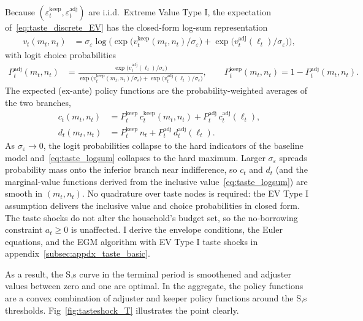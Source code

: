 Because $(\varepsilon_t^{\text{keep}},\varepsilon_t^{\text{adj}})$ are i.i.d.\ Extreme Value Type I, the expectation of~\eqref{eq:taste_discrete_EV} has the closed-form log-sum representation
\begin{align}
	v_t(m_t,n_t)
	&= \sigma_\varepsilon \log\Big(
		\exp\big(v_t^{\text{keep}}(m_t,n_t)/\sigma_\varepsilon\big)
		+ \exp\big(v_t^{\text{adj}}(\ell_t)/\sigma_\varepsilon\big)
	\Big), \label{eq:taste_logsum}
\end{align}
with logit choice probabilities
\begin{align}
	P_t^{\text{adj}}(m_t,n_t)
	&= \frac{\exp\big(v_t^{\text{adj}}(\ell_t)/\sigma_\varepsilon\big)}
	{\exp\big(v_t^{\text{keep}}(m_t,n_t)/\sigma_\varepsilon\big)
	+ \exp\big(v_t^{\text{adj}}(\ell_t)/\sigma_\varepsilon\big)},
	\qquad
	P_t^{\text{keep}}(m_t,n_t) = 1 - P_t^{\text{adj}}(m_t,n_t). \label{eq:taste_logit}
\end{align}
The expected (ex-ante) policy functions are the probability-weighted averages of the two branches,
\begin{align}
	c_t(m_t,n_t) &= P_t^{\text{keep}}\, c_t^{\text{keep}}(m_t,n_t) + P_t^{\text{adj}}\, c_t^{\text{adj}}(\ell_t), \label{eq:taste_c_combined}\\
	d_t(m_t,n_t) &= P_t^{\text{keep}}\, n_t + P_t^{\text{adj}}\, d_t^{\text{adj}}(\ell_t). \label{eq:taste_d_combined}
\end{align}
As $\sigma_\varepsilon \to 0$, the logit probabilities collapse to the hard indicators of the baseline model and~\eqref{eq:taste_logsum} collapses to the hard maximum. Larger $\sigma_\varepsilon$ spreads probability mass onto the inferior branch near indifference, so $c_t$ and $d_t$ (and the marginal-value functions derived from the inclusive value~\eqref{eq:taste_logsum}) are smooth in $(m_t,n_t)$. No quadrature over taste nodes is required: the EV Type I assumption delivers the inclusive value and choice probabilities in closed form. The taste shocks do not alter the household's budget set, so the no-borrowing constraint $a_t \ge 0$ is unaffected. I derive the envelope conditions, the Euler equations, and the EGM algorithm with EV Type I taste shocks in appendix~\ref{subsec:appdx_taste_basic}.

As a result, the S,s curve in the terminal period is smoothened and adjuster values between zero and one are optimal. In the aggregate, the policy functions are a convex combination of adjuster and keeper policy functions around the S,s thresholds. Fig~\ref{fig:tasteshock_T} illustrates the point clearly.

